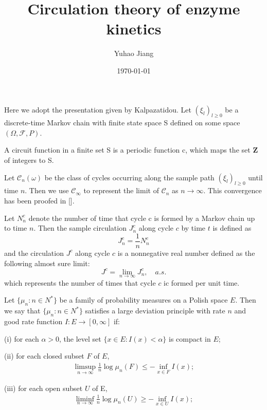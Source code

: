 \documentclass[11pt,en,cite=authoryear]{elegantpaper}
\title{Circulation theory of enzyme kinetics}
\author{Yuhao Jiang}
\date{\today}
\begin{document}
\maketitle

Here we adopt the presentation given by Kalpazatidou.
Let $(\xi_l)_{l\ge 0}$ be a discrete-time Markov chain with finite state space S defined on some space $(\Omega, \mathcal{F}, P)$. \\

\begin{definition}
    A circuit function in a finite set S is a periodic function c, which maps the set $\mathbf{Z}$ of integers to S.
\end{definition}

\begin{definition}
    Let $\mathcal{C}_n(\omega)$ be the class of cycles occurring along the sample path $(\xi_l)_{l\ge 0}$ until time $n$. Then we use $\mathcal{C}_{\infty}$ to represent the limit of $\mathcal{C}_n$ as $n \rightarrow \infty$. This convergence has been proofed in [].
\end{definition}

\begin{definition} %
    Let $N_n^c$ denote the number of time that cycle c is formed by a Markov chain up to time $n$. Then the sample circulation $J_n^c$ along cycle $c$ by time $t$ is defined as
    $$
    J_n^c = \frac{1}{n} N_n^c
    $$
    and the circulation $J^c$ along cycle $c$ is a nonnegative real number defined as the following almost sure limit:
    $$
    J^c = \lim_{n \rightarrow \infty} J_n^c, \quad a.s.
    $$
    which represents the number of times that cycle $c$ ic formed per unit time.
\end{definition}

\begin{definition}
    Let $\{\mu_n: n \in N^*\}$ be a family of probability measures on a Polish
    space $E$. Then we say that $\{\mu_n: n \in N^*\}$ satisfies a large deviation principle with rate $n$ and good rate function $I: E \rightarrow [0, \infty]$ if: 

    (i) for each $\alpha >0$, the level set $\{x\in E: I(x)<\alpha\}$ is compact in $E$;

    (ii) for each closed subset $F$ of $E$,
    \begin{align}
        \limsup_{n \rightarrow \infty} \frac{1}{n} \log \mu_n(F) \leq -\inf_{x\in F} I(x);
    \end{align}

    (iii) for each open subset $U$ of E,
    \begin{align}
        \liminf_{n \rightarrow \infty} \frac{1}{n} \log \mu_n(U) \geq -\inf_{x\in U} I(x);
    \end{align}
\end{definition}
\end{document}
